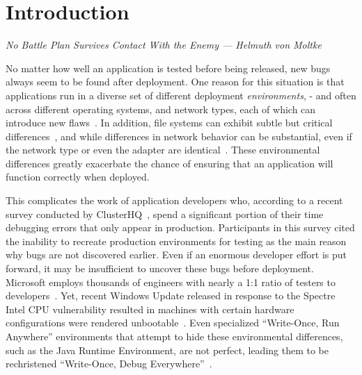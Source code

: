 \section{Introduction}
\label{SEC:introduction}
\textit{No Battle Plan Survives Contact With the Enemy --- Helmuth von Moltke}

No matter how well an application is tested before being released, new bugs
always seem to be found after deployment.  One reason for this situation
is that applications run in a diverse set of
different deployment \emph{environments}, - and often
across different operating systems, and network types,
each of which can introduce new flaws~\cite{LinuxGlibcChanges}.
In addition, file
systems can exhibit subtle but critical
differences~\cite{EXT4Layout, AppleHFS}, and while differences in network
behavior can
be substantial, even if the network type or even the
adapter are identical~\cite{vbox}. These environmental differences greatly
exacerbate the chance of ensuring that an application will function
correctly when deployed.

This complicates the work of application developers who, according to a
recent survey conducted by ClusterHQ~\cite{ClusterHQSurvey},
spend a significant portion of their time
debugging errors that only appear in production.
Participants in this survey cited the inability to recreate
production environments for
testing as the main reason why bugs are not discovered earlier.
Even if an
enormous developer effort is put forward, it may be insufficient
to uncover these bugs
before deployment.  Microsoft employs thousands of engineers with nearly a
1:1 ratio of testers to developers~\cite{Page2009}.
Yet, recent Windows Update released in response
to the Spectre Intel CPU vulnerability resulted in machines with certain
hardware configurations were rendered unbootable~\cite{kb4056892}.  Even
specialized ``Write-Once, Run Anywhere'' environments that attempt to hide
these environmental differences, such as the Java Runtime Environment, are
not perfect, leading them to be rechristened ``Write-Once, Debug
Everywhere''~\cite{WODE}.

